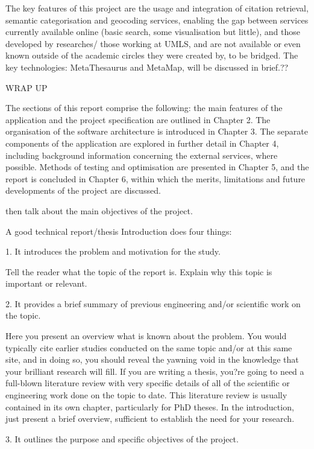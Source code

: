 \documentclass[Report.tex]{subfiles}
\begin{document}
The key features of this project are the usage and integration of citation retrieval, semantic categorisation and geocoding services, enabling the gap between services currently available online (basic search, some visualisation but little), and those developed by researches/ those working at UMLS, and are not available or even known outside of the academic circles they were created by, to be bridged. The key technologies: MetaThesaurus and MetaMap, will be discussed in brief.??

WRAP UP

The sections of this report comprise the following: the main features of the application and the project specification are outlined in Chapter 2. The organisation of the software architecture is introduced in Chapter 3. The separate components of the application are explored in further detail in Chapter 4, including background information concerning the external services, where possible. Methods of testing and optimisation are presented in Chapter 5, and the report is concluded in Chapter 6, within which the merits, limitations and future developments of the project are discussed.

then talk about the main objectives of the project.

A good technical report/thesis Introduction does four things:

1.       It introduces the problem and motivation for the study.

    Tell the reader what the topic of the report is.
    Explain why this topic is important or relevant.

2.       It provides a brief summary of previous engineering and/or scientific work on the topic.

    Here you present an overview what is known about the problem.  You would typically cite earlier studies conducted on the same topic and/or at this same site, and in doing so, you should reveal the yawning void in the knowledge that your brilliant research will fill.
    If you are writing a thesis, you?re going to need a full-blown literature review with very specific details of all of the scientific or engineering work done on the topic to date.  This literature review is usually contained in its own chapter, particularly for PhD theses.  In the introduction, just present a brief overview, sufficient to establish the need for your research.

3.       It outlines the purpose and specific objectives of the project.
\end{document}
